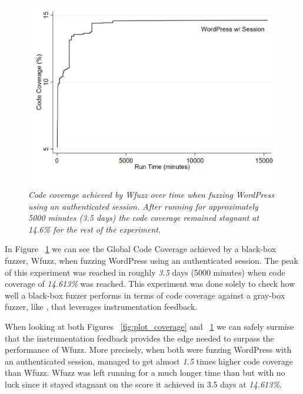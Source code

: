 \begin{figure}[!htb]
  \centering \includegraphics[width=\linewidth]{figures/plot_coverage2.pdf}
  \captionsetup{justification=centering} 
  \caption[Accumulated Global Code Coverage using Wfuzz]{\textit{Code coverage achieved by Wfuzz over time when fuzzing WordPress using an authenticated session. After running for approximately 5000 minutes (3.5 days) the code coverage remained stagnant at 14.6\% for the rest of the experiment.}}
  \label{fig:plot_coverage2}
\end{figure}

In Figure ~\ref{fig:plot_coverage2} we can see the Global Code Coverage achieved by a black-box fuzzer, Wfuzz, when fuzzing WordPress using an authenticated session. The peak of this experiment was reached in roughly \emph{3.5} days (5000 minutes) when code coverage of \emph{14.613\%} was reached. This experiment was done solely to check how well a black-box fuzzer performs in terms of code coverage against a gray-box fuzzer, like \pname{}, that leverages instrumentation feedback. 

When looking at both Figures ~\ref{fig:plot_coverage} and ~\ref{fig:plot_coverage2} we can safely surmise that the instrumentation feedback provides \pname{} the edge needed to surpass the performance of Wfuzz. More precisely, when both were fuzzing WordPress with an authenticated session, \pname{} managed to get almost \emph{1.5} times higher code coverage than Wfuzz. Wfuzz was left running for a much longer time than \pname{} but with no luck since it stayed stagnant on the score it achieved in 3.5 days at \emph{14.613\%}.